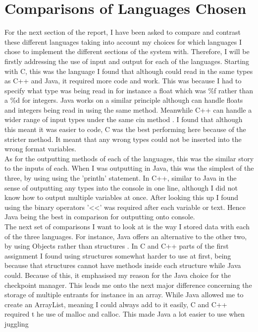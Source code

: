 \documentclass[a4paper]{article}
\begin{document}
\section{Comparisons of Languages Chosen}	
For the next section of the report, I have been asked to compare and contrast
these different languages taking into account my choices for which languages I
chose to implement the different sections of the system with. 
Therefore, I will be firstly addressing the use of input and output for each of
the languages. Starting with C, this was the language I found that although
could read in the same types as C++ and Java, it required more code and work.
This was because I had to specify what type was being read in for instance a
float which was \%f rather than a \%d for integers. Java works on a similar
principle although can handle floats and integers being read in using the same
method. 
Meanwhile C++ can handle a wider range of input types under the same cin method
. I found that although this meant it was easier to code, C was the best
performing here because of the stricter method. It meant that any wrong types
could not be inserted into the wrong format variables.
 \\[4mm]
As for the outputting methods of each of the languages, this was the similar
story to the inputs of each. When I was outputting in Java, this was the
simplest of the three, by using using the 'println' statement. In C++, similar
to Java in the sense of outputting any types into the console in one line,
although I did not know how to output multiple variables at once. After looking
this up I found using the binary operators '\textless\textless' was required
after each variable or text. Hence Java being the best in comparison for
outputting onto console.
 \\[4mm]
The next set of comparisons I want to look at is the way I stored data with each
of the three languages. For instance, Java offers an alternative to the other
two, by using Objects rather than structures \cite{differences}. In C and C++ 
parts of the first assignment I found using structures somewhat harder to use 
at first, being because that structures cannot have methods inside each structure 
while Java could. Because of this, it emphasised my reason for the Java choice 
for the checkpoint manager. This leads me onto the next major difference concerning 
the storage of multiple entrants for instance in an array. While Java allowed me to 
create an ArrayList, meaning I could always add to it easily, C and C++ required t
he use of malloc and calloc. This made Java a lot easier to use when juggling 
\end{document}
